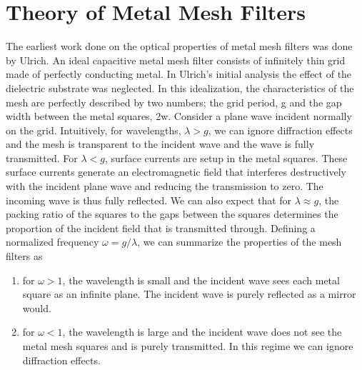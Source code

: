 \documentclass[12pt]{article}
\begin{document}


\section{Theory of Metal Mesh Filters}
   
The earliest work done on the optical properties of metal mesh filters was done by Ulrich. An ideal capacitive metal mesh filter consists of infinitely thin grid made of perfectly conducting metal. In Ulrich's initial analysis the effect of the dielectric substrate was neglected. In this idealization, the characteristics of the mesh are perfectly described by two numbers; the grid period, g and the gap width between the metal squares, 2w. Consider a plane wave incident normally on the grid. Intuitively, for wavelengths, $\lambda > g$, we can ignore diffraction effects and the mesh is transparent to the incident wave and the wave is fully transmitted. For $\lambda < g$, surface currents are setup in the metal squares. These surface currents generate an electromagnetic field that interferes destructively with the incident plane wave and reducing the transmission to zero. The incoming wave is thus fully reflected. We can also expect that for $\lambda \approx g$, the packing ratio of the squares to the gaps between the squares determines the proportion of the incident field that is transmitted through. Defining a normalized frequency $\omega = g/\lambda$, we can summarize the properties of the mesh filters as 

\begin{enumerate}
    \item for $\omega > 1$, the wavelength is small and the incident wave sees each metal square as an infinite plane. The incident wave is purely reflected as a mirror would.
    \item for $\omega < 1$, the wavelength is large and the incident wave does not see the metal mesh squares and is purely transmitted. In this regime we can ignore diffraction effects.
\end{enumerate}  
\end{document}
